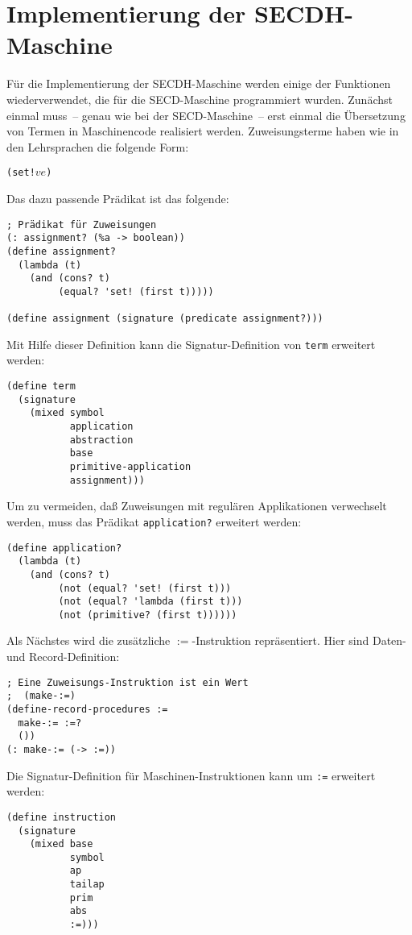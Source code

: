 \section{Implementierung der SECDH-Maschine}


Für die Implementierung der SECDH-Maschine werden einige der
Funktionen wiederverwendet, die für die SECD-Maschine programmiert
wurden.  Zunächst einmal muss~-- genau wie bei der SECD-Maschine~--
erst einmal die Übersetzung von Termen in Maschinencode realisiert
werden.  Zuweisungsterme haben wie in den Lehrsprachen die folgende Form:
%
\begin{alltt}
(set! \(v\) \(e\))
\end{alltt}
%
Das dazu passende Prädikat ist das folgende:
%
\begin{verbatim}
; Prädikat für Zuweisungen
(: assignment? (%a -> boolean))
(define assignment?
  (lambda (t)
    (and (cons? t)
         (equal? 'set! (first t)))))

(define assignment (signature (predicate assignment?)))
\end{verbatim}
%
Mit Hilfe dieser Definition kann die Signatur-Definition von
\texttt{term} erweitert werden:
%
\begin{verbatim}
(define term
  (signature
    (mixed symbol
           application
           abstraction
           base
           primitive-application
           assignment)))
\end{verbatim}
%
Um zu vermeiden, daß Zuweisungen mit regulären Applikationen
verwechselt werden, muss das Prädikat \texttt{application?} erweitert
werden:
%
\begin{verbatim}
(define application?
  (lambda (t)
    (and (cons? t)
         (not (equal? 'set! (first t)))
         (not (equal? 'lambda (first t)))
         (not (primitive? (first t))))))
\end{verbatim}
%
Als Nächstes wird die zusätzliche $\mathtt{:=}$-Instruktion
repräsentiert.  Hier sind Daten- und Record-Definition:
%
\begin{verbatim}
; Eine Zuweisungs-Instruktion ist ein Wert
;  (make-:=)
(define-record-procedures :=
  make-:= :=?
  ())
(: make-:= (-> :=))
\end{verbatim}
%
Die Signatur-Definition für Maschinen-Instruktionen kann um \texttt{:=}
erweitert werden:
%
\begin{verbatim}
(define instruction
  (signature
    (mixed base
           symbol
           ap
           tailap
           prim
           abs
           :=)))
\end{verbatim}

